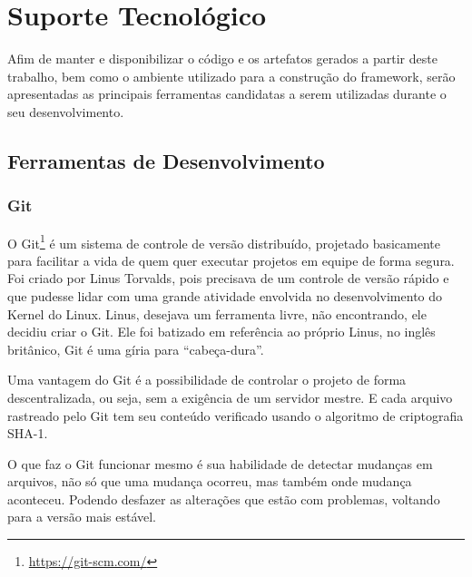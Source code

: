 \chapter{Suporte Tecnológico}

Afim de manter e disponibilizar o código e os artefatos gerados a partir deste trabalho, bem como o ambiente utilizado para a construção do framework, serão apresentadas as principais ferramentas candidatas a serem utilizadas durante o seu desenvolvimento.

\section{Ferramentas de Desenvolvimento}

\subsection{Git}

O Git\footnote{\url{https://git-scm.com/}} é um sistema de controle de versão distribuído, projetado basicamente para facilitar a vida de quem quer executar projetos em equipe de forma segura. Foi criado por Linus Torvalds, pois precisava de um controle de versão rápido e que pudesse lidar com uma grande atividade envolvida no desenvolvimento do Kernel do Linux. Linus, desejava um ferramenta livre, não encontrando, ele decidiu criar o Git. Ele foi batizado em referência ao próprio Linus, no inglês britânico, Git é uma gíria para ``cabeça-dura''.

Uma vantagem do Git é a possibilidade de controlar o projeto de forma descentralizada, ou seja, sem a exigência de um servidor mestre. E cada arquivo rastreado pelo Git tem seu conteúdo verificado usando o algoritmo de criptografia SHA-1.

O que faz o Git funcionar mesmo é sua habilidade de detectar mudanças em arquivos, não só que uma mudança ocorreu, mas também onde mudança aconteceu. Podendo desfazer as alterações que estão com problemas, voltando para a versão mais estável.

